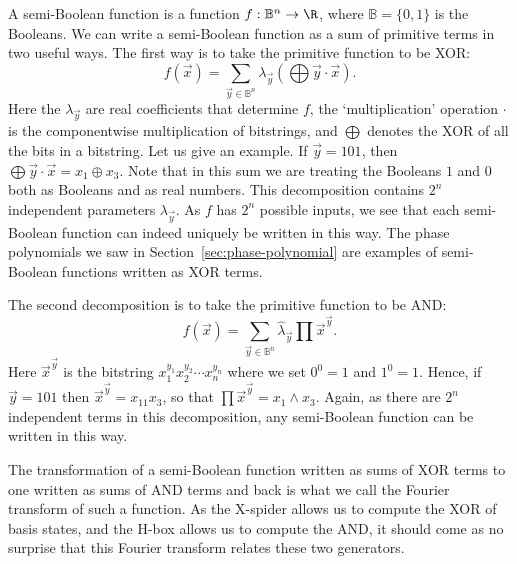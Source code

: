 \documentclass[a4paper,onecolumn,superscriptaddress,11pt,%
				unpublished,%
				allowfontchageintitle,%
				]{quantumarticle}
\begin{document}
A semi-Boolean function is a function $f:\mathbb B^n\rightarrow \R$, where $\mathbb B = \{0,1\}$ is the Booleans. We can write a semi-Boolean function as a sum of primitive terms in two useful ways.
The first way is to take the primitive function to be XOR:
\[f(\vec x) = \sum_{\vec y\in \mathbb B^n} \lambda_{\vec y}\left(\bigoplus \vec y\cdot \vec x\right).\]
Here the $\lambda_{\vec y}$ are real coefficients that determine $f$, the `multiplication' operation $\cdot$ is the componentwise multiplication of bitstrings, and $\bigoplus$ denotes the XOR of all the bits in a bitstring.
Let us give an example. If $\vec y = 101$, then $\bigoplus \vec y\cdot \vec x = x_1\oplus x_3$. Note that in this sum we are treating the Booleans $1$ and $0$ both as Booleans and as real numbers.
This decomposition contains $2^n$ independent parameters $\lambda_{\vec y}$. As $f$ has $2^n$ possible inputs, we see that each semi-Boolean function can indeed uniquely be written in this way. The phase polynomials we saw in Section~\ref{sec:phase-polynomial} are examples of semi-Boolean functions written as XOR terms.

The second decomposition is to take the primitive function to be AND:
\[f(\vec x) = \sum_{\vec y\in \mathbb B^n} \hat{\lambda}_{\vec y}\prod \vec x^{\vec y}.\]
Here $\vec x^{\vec y}$ is the bitstring $x_1^{y_1}x_2^{y_2}\cdots x_n^{y_n}$ where we set $0^0 = 1$ and $1^0 = 1$. Hence, if $\vec y = 101$ then $\vec x^{\vec y} = x_11x_3$, so that $\prod \vec x^{\vec y} = x_1\wedge x_3$. Again, as there are $2^n$ independent terms in this decomposition, any semi-Boolean function can be written in this way.

The transformation of a semi-Boolean function written as sums of XOR terms to one written as sums of AND terms and back is what we call the Fourier transform of such a function.
As the X-spider allows us to compute the XOR of basis states, and the H-box allows us to compute the AND, it should come as no surprise that this Fourier transform relates these two generators.
\end{document}
